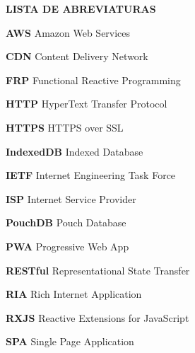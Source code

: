 
\begin{center}
\textsc{\bfseries\uppercase{Lista de Abreviaturas}}
\end{center}

{
\setlength{\parskip}{1em}

\textbf{AWS} Amazon Web Services

\textbf{CDN} Content Delivery Network

\textbf{FRP} Functional Reactive Programming

\textbf{HTTP} HyperText Transfer Protocol

\textbf{HTTPS} HTTPS over SSL

\textbf{IndexedDB} Indexed Database

\textbf{IETF} Internet Engineering Task Force

\textbf{ISP} Internet Service Provider

\textbf{PouchDB} Pouch Database

\textbf{PWA} Progressive Web App

\textbf{RESTful} Representational State Transfer

\textbf{RIA} Rich Internet Application

\textbf{RXJS} Reactive Extensions for JavaScript

\textbf{SPA} Single Page Application
}

\newpage
